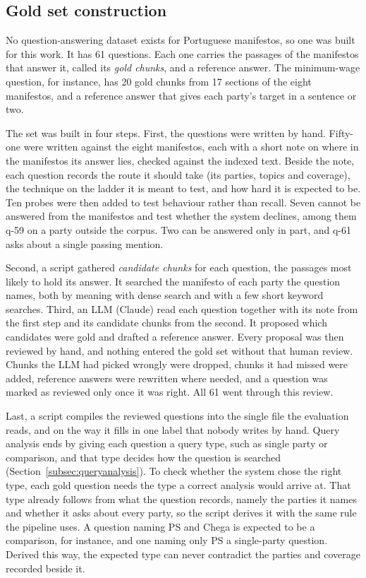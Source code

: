 \subsection{Gold set construction} \label{subsec:goldset}
No question-answering dataset exists for Portuguese manifestos, so one was
built for this work. It has 61 questions. Each one carries the passages of the
manifestos that answer it, called its \emph{gold chunks}, and a reference
answer. The minimum-wage question, for instance, has 20 gold chunks from 17
sections of the eight manifestos, and a reference answer that gives each
party's target in a sentence or two.

The set was built in four steps. First, the questions were written by hand.
Fifty-one were written against the eight manifestos, each with a short note on
where in the manifestos its answer lies, checked against the indexed text.
Beside the note, each question records the route it should take (its parties,
topics and coverage), the technique on the ladder it is meant to test, and how
hard it is expected to be. Ten probes
were then added to test behaviour rather than recall. Seven cannot be answered
from the manifestos and test whether the system declines, among them q-59 on a
party outside the corpus. Two can be answered only in part, and q-61 asks about
a single passing mention.

Second, a script gathered \emph{candidate chunks} for each question, the
passages most likely to hold its answer. It searched the manifesto of each
party the question names, both by meaning with dense search and with a few
short keyword searches. Third, an LLM (Claude) read each question together
with its note from the first step and its candidate chunks from the second. It
proposed which candidates were gold and drafted a reference answer. Every
proposal was then reviewed by hand, and nothing entered the gold set without
that human review. Chunks the LLM had picked wrongly were dropped, chunks it
had missed were added, reference answers were rewritten where needed, and a
question was marked as reviewed only once it was right. All 61 went through
this review.

Last, a script compiles the reviewed questions into the single file the
evaluation reads, and on the way it fills in one label that nobody writes by
hand. Query analysis ends by giving each question a query type, such as
single party or comparison, and that type decides how the question is
searched (Section~\ref{subsec:queryanalysis}). To check whether the system
chose the right type, each gold question needs the type a correct analysis
would arrive at. That type already follows from what the question records,
namely the parties it names and whether it asks about every party, so the
script derives it with the same rule the pipeline uses. A question naming PS
and Chega is expected to be a comparison, for instance, and one naming only PS
a single-party question. Derived this way, the expected type can never
contradict the parties and coverage recorded beside it.

